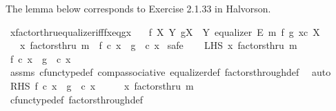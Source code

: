 \begin{isabellebody}
\endisatagproof
{\isafoldproof}%
%
\isadelimproof
%
\endisadelimproof
%
\begin{isamarkuptext}%
The lemma below corresponds to Exercise 2.1.33 in Halvorson.%
\end{isamarkuptext}\isamarkuptrue%
\isamarkupfalse%
\ xfactorthru{\isacharunderscore}{\kern0pt}equalizer{\isacharunderscore}{\kern0pt}iff{\isacharunderscore}{\kern0pt}fx{\isacharunderscore}{\kern0pt}eq{\isacharunderscore}{\kern0pt}gx{\isacharcolon}{\kern0pt}\isanewline
\ \ \ {\isachardoublequoteopen}f{\isacharcolon}{\kern0pt}\ X{\isasymrightarrow}\ Y{\isachardoublequoteclose}\ {\isachardoublequoteopen}g{\isacharcolon}{\kern0pt}X\ {\isasymrightarrow}\ Y{\isachardoublequoteclose}\ {\isachardoublequoteopen}equalizer\ E\ m\ f\ g{\isachardoublequoteclose}\ {\isachardoublequoteopen}x{\isasymin}\isactrlsub c\ X{\isachardoublequoteclose}\isanewline
\ \ \ {\isachardoublequoteopen}x\ factorsthru\ m\ {\isasymlongleftrightarrow}\ f\ {\isasymcirc}\isactrlsub c\ x\ {\isacharequal}{\kern0pt}\ g\ \ {\isasymcirc}\isactrlsub c\ x{\isachardoublequoteclose}\isanewline
%
\isadelimproof
%
\endisadelimproof
%
\isatagproof
{}\isamarkupfalse%
\ safe\isanewline
\ \ \isamarkupfalse%
\ LHS{\isacharcolon}{\kern0pt}\ {\isachardoublequoteopen}x\ factorsthru\ m{\isachardoublequoteclose}\isanewline
\ \ \isamarkupfalse%
\ \isamarkupfalse%
\ {\isachardoublequoteopen}f\ {\isasymcirc}\isactrlsub c\ x\ {\isacharequal}{\kern0pt}\ g\ \ {\isasymcirc}\isactrlsub c\ x{\isachardoublequoteclose}\isanewline
\ \ \ \ \isamarkupfalse%
\ assms{\isacharparenleft}{\kern0pt}{}{\isacharparenright}{\kern0pt}\ cfunc{\isacharunderscore}{\kern0pt}type{\isacharunderscore}{\kern0pt}def\ comp{\isacharunderscore}{\kern0pt}associative\ equalizer{\isacharunderscore}{\kern0pt}def\ factors{\isacharunderscore}{\kern0pt}through{\isacharunderscore}{\kern0pt}def\ \isamarkupfalse%
\ auto\isanewline
{}\isamarkupfalse%
\isanewline
\ \ \isamarkupfalse%
\ RHS{\isacharcolon}{\kern0pt}\ {\isachardoublequoteopen}f\ {\isasymcirc}\isactrlsub c\ x\ {\isacharequal}{\kern0pt}\ g\ \ {\isasymcirc}\isactrlsub c\ x{\isachardoublequoteclose}\isanewline
\ \ \isamarkupfalse%
\ \isamarkupfalse%
\ {\isachardoublequoteopen}x\ factorsthru\ m{\isachardoublequoteclose}\isanewline
\ \ \ \ \isamarkupfalse%
\ cfunc{\isacharunderscore}{\kern0pt}type{\isacharunderscore}{\kern0pt}def\ factors{\isacharunderscore}{\kern0pt}through{\isacharunderscore}{\kern0pt}def\isanewline

\end{isabellebody}
